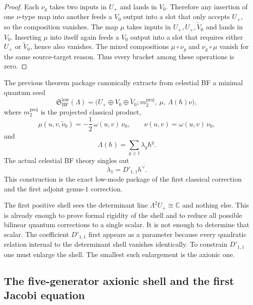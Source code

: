 \begin{proof}
Each $\nu_g$ takes two inputs in $U_+$ and lands in $V_0$.
Therefore any insertion of one $\nu$-type map into another feeds a $V_0$
output into a slot that only accepts $U_+$, so the composition vanishes.
The map $\mu$ takes inputs in $U_+,U_+,\widetilde V_0$ and lands in $V_0$.
Inserting $\mu$ into itself again feeds a $V_0$ output into a slot that
requires either $U_+$ or $\widetilde V_0$, hence also vanishes.
The mixed compositions $\mu\circ \nu_g$ and $\nu_g\circ \mu$ vanish for the
same source-target reason.
Thus every bracket among these operations is zero.
\end{proof}

\begin{construction}
\label{def:frontier-partial-low-mode-quantum-seed}
The previous theorem package canonically extracts from celestial BF a
minimal quantum seed
\[
\mathfrak S_{\mathrm{BF}}^{\mathrm{low}}(\Lambda)
=
\bigl(U_+\oplus V_0\oplus \widetilde V_0;
 m_2^{\mathrm{proj}},\ \mu,\ \Lambda(\hbar)\nu\bigr),
\]
where $m_2^{\mathrm{proj}}$ is the projected classical product,
\[
\mu(u,v,\widetilde\nu_0)=-\frac12\,\omega(u,v)\,\nu_0,
\qquad
\nu(u,v)=\omega(u,v)\,\nu_0,
\]
and
\[
\Lambda(\hbar)=\sum_{g\ge 1}\lambda_g\hbar^g.
\]
The actual celestial BF theory singles out
\[
\lambda_1 = D'_{1,1}h^\vee.
\]
This construction is the exact low-mode package of the first classical
correction and the first adjoint genus-$1$ correction.
\end{construction}

\begin{remark}
\label{rem:frontier-positive-shell-what-it-knows}
The first positive shell sees the determinant line
$\Lambda^2U_+\cong \mathbb C$ and nothing else.
This is already enough to prove formal rigidity of the shell and to reduce
all possible bilinear quantum corrections to a single scalar.
It is not enough to determine that scalar.
The coefficient $D'_{1,1}$ first appears as a parameter because every
quadratic relation internal to the determinant shell vanishes identically.
To constrain $D'_{1,1}$ one must enlarge the shell.
The smallest such enlargement is the axionic one.
\end{remark}

\subsection{The five-generator axionic shell and the first Jacobi equation}
\label{subsec:frontier-five-generator-shell}

